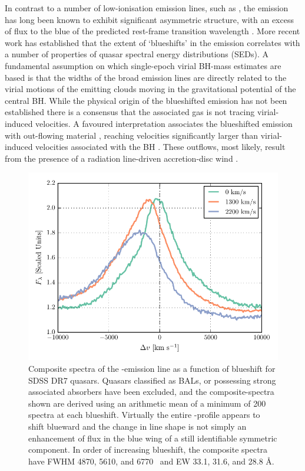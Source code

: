 In contrast to a number of low-ionisation emission lines, such as , the  emission has long been known to exhibit significant asymmetric structure, with an excess of flux to the blue of the predicted rest-frame transition wavelength \citep{gaskell82}. 
More recent work \citep[e.g.][]{sulentic00a, richards11} has established that the extent of `blueshifts' in the  emission correlates with a number of properties of quasar spectral energy distributions (SEDs). 
A fundamental assumption on which single-epoch virial BH-mass estimates are based is that the widths of the broad emission lines are directly related to the virial motions of the emitting clouds moving in the gravitational potential of the central BH. 
While the physical origin of the blueshifted emission has not been established there is a consensus that the associated gas is not tracing virial-induced velocities.  
A favoured interpretation associates the blueshifted emission with out-flowing material \citep[see][for a recent review]{netzer15}, reaching velocities significantly larger than virial-induced velocities associated with the BH \citep[e.g.][]{sulentic07, richards11}.
These outflows, most likely, result from the presence of a radiation line-driven accretion-disc wind \citep[e.g.][]{konigl94, murray95, proga00, everett05, gallagher15,higginbottom15}.  

\begin{figure}
    \centering
    \includegraphics[width=0.9\linewidth]{figures/chapter03/civ_composites.pdf}
    \caption{Composite spectra of the -emission line as a function of  blueshift for SDSS DR7 quasars. Quasars classified as BALs, or possessing strong associated absorbers have been excluded, and the composite-spectra shown are derived using an arithmetic mean of a minimum of 200 spectra at each blueshift. Virtually the entire -profile appears to shift blueward and the change in line shape is not simply an enhancement of flux in the blue wing of a still identifiable symmetric component. In order of increasing  blueshift, the composite spectra have FWHM 4870, 5610, and 6770 \kms\, and EW 33.1, 31.6, and 28.8 \AA.}
    \label{fig:civ_composites}
\end{figure}

